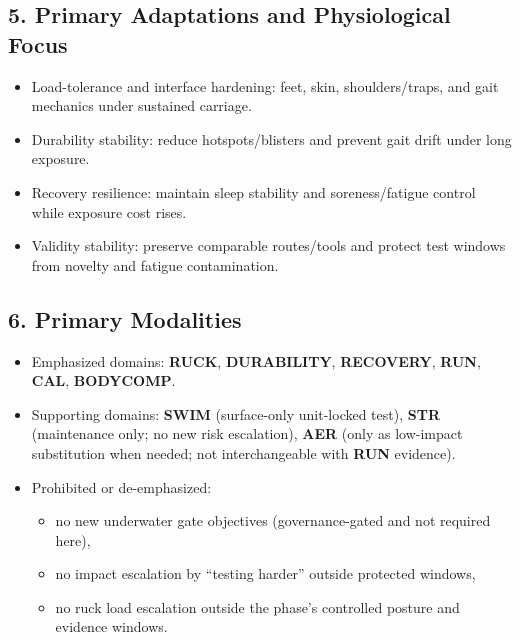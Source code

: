 \documentclass[10pt]{article}
\begin{document}
\subsection*{5. Primary Adaptations and Physiological Focus}


\begin{itemize}
\item Load-tolerance and interface hardening: feet, skin, shoulders/traps, and gait mechanics under sustained carriage.
\item Durability stability: reduce hotspots/blisters and prevent gait drift under long exposure.
\item Recovery resilience: maintain sleep stability and soreness/fatigue control while exposure cost rises.
\item Validity stability: preserve comparable routes/tools and protect test windows from novelty and fatigue contamination.
\end{itemize}

\subsection*{6. Primary Modalities}


\begin{itemize}
\item Emphasized domains: \textbf{RUCK}, \textbf{DURABILITY}, \textbf{RECOVERY}, \textbf{RUN}, \textbf{CAL}, \textbf{BODYCOMP}.
\item Supporting domains: \textbf{SWIM} (surface-only unit-locked test), \textbf{STR} (maintenance only; no new risk escalation), \textbf{AER} (only as low-impact substitution when needed; not interchangeable with \textbf{RUN} evidence).
\item Prohibited or de-emphasized:
  \begin{itemize}
  \item no new underwater gate objectives (governance-gated and not required here),
  \item no impact escalation by “testing harder” outside protected windows,
  \item no ruck load escalation outside the phase’s controlled posture and evidence windows.
  \end{itemize}
\end{itemize}
\end{document}
